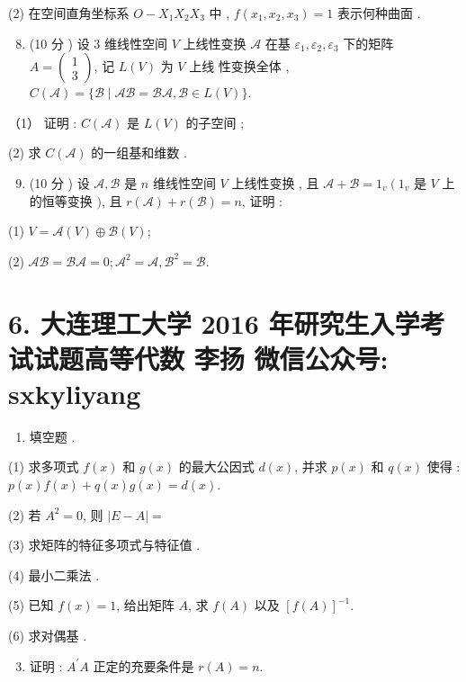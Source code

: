 \documentclass[10pt]{article}
\begin{document}
{(2)  在空间直角坐标系  $O-X_{1} X_{2} X_{3}$  中 , $f\left(x_{1}, x_{2}, x_{3}\right)=1$  表示何种曲面 .

\begin{enumerate}
  \setcounter{enumi}{7}
  \item (10  分 )  设  3  维线性空间  $V$  上线性变换  $\mathscr{A}$  在基  $\varepsilon_{1}, \varepsilon_{2}, \varepsilon_{3}$  下的矩阵  $A=\left(\begin{array}{c}1 \\ 3\end{array}\right)$,  记  $L(V)$  为  $V$  上线   性变换全体 , $C(\mathscr{A})=\{\mathscr{B} \mid \mathscr{A} \mathscr{B}=\mathscr{B} \mathscr{A}, \mathscr{B} \in L(V)\}$.
\end{enumerate}
（1）  证明 : $C(\mathscr{A})$  是  $L(V)$  的子空间 ;

(2)  求  $C(\mathscr{A})$  的一组基和维数 .

\begin{enumerate}
  \setcounter{enumi}{8}
  \item (10  分 )  设  $\mathscr{A}, \mathscr{B}$  是  $n$  维线性空间  $V$  上线性变换 ,  且  $\mathscr{A}+\mathscr{B}=1_{v}\left(1_{v}\right.$  是  $V$  上的恒等变换  $)$,  且  $r(\mathscr{A})+r(\mathscr{B})=n$,  证明 :
\end{enumerate}
(1) $V=\mathscr{A}(V) \oplus \mathscr{B}(V)$;

(2) $\mathscr{A} \mathscr{B}=\mathscr{B} \mathscr{A}=0 ; \mathscr{A}^{2}=\mathscr{A}, \mathscr{B}^{2}=\mathscr{B}$.

\section{6. 大连理工大学 2016 年研究生入学考试试题高等代数 
 李扬 
 微信公众号: sxkyliyang}
\begin{enumerate}
  \item  填空题 .
\end{enumerate}
(1)  求多项式  $f(x)$  和  $g(x)$  的最大公因式  $d(x)$,  并求  $p(x)$  和  $q(x)$  使得 : $p(x) f(x)+q(x) g(x)=d(x)$.

(2)  若  $A^{2}=0$,  则  $|E-A|=$

(3)  求矩阵的特征多项式与特征值 .

(4)  最小二乘法 .

(5)  已知  $f(x)=1$,  给出矩阵  $A$,  求  $f(A)$  以及  $[f(A)]^{-1}$.

(6)  求对偶基 .

\begin{enumerate}
  \setcounter{enumi}{2}
  \item  证明 : $A^{\prime} A$  正定的充要条件是  $r(A)=n$.


\end{enumerate}}
\end{document}
